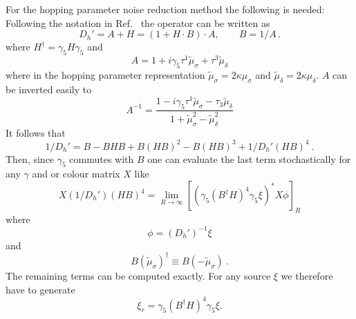 For the hopping parameter noise reduction method the following is
needed: Following the notation in Ref.~\cite{Boucaud:2008xu} the
operator can be written as
\[
D_h' = A + H = (1+H\cdot B)\cdot A,\qquad B=1/A\, .
\]
where $H^\dagger = \gamma_5 H \gamma_5$ and
\[
A = 1 + i\gamma_5\tau^1\tilde\mu_\sigma + \tau^3\tilde\mu_\delta
\]
where in the hopping parameter representation $\tilde\mu_\sigma =
2\kappa\mu_\sigma$ and $\tilde\mu_\delta=2\kappa\mu_\delta$. $A$ can
be inverted easily to
\[
A^{-1}=\frac{1-i\gamma_5 \tau^1 \tilde\mu_\sigma - \tau_3
  \tilde\mu_\delta}{1+\tilde\mu_\sigma^2-\tilde\mu_\delta^2} 
\]
It follows that
\[
1/D_h' = B-BHB+B(HB)^2-B(HB)^3+1/D_h'(HB)^4\ .
\]
Then, since $\gamma_5$ commutes with $B$ one can evaluate the last
term stochastically for any $\gamma$ and or colour matrix $X$ like 
\[
X (1/D_h')(HB)^4 = \lim_{R\to\infty}\left[(\gamma_5 (B^{\dagger} H )^4
  \gamma_5 \xi)^* X \phi\right]_R
\]
where
\[
\phi = (D_h')^{-1}\xi
\]
and
\[
B(\tilde\mu_\sigma)^\dagger \equiv B(-\tilde\mu_\sigma)\ .
\]
The remaining terms can be computed exactly. For any source $\xi$ we 
therefore have to generate
\[
\xi_r = \gamma_5 (B^{\dagger} H )^4\gamma_5 \xi.
\]


%
%
%



